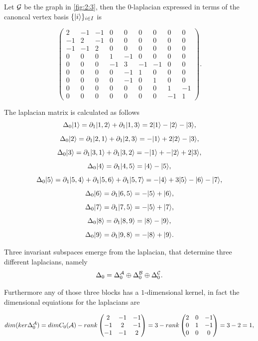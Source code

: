 \documentclass[../2.tex]{subfiles}
\begin{document}
    \begin{exa}
        Let $\mathcal{G}$ be the graph  in \autoref{fig:2:3}, then the $0$-laplacian expressed in terms of the canoncal vertex basis $\{| i \rangle\}_{i \in I}$ is

        \[\begin{pmatrix}
                2 & -1 & -1 & 0 & 0 & 0 & 0 & 0 & 0 \\
                -1 & 2 & -1 & 0 & 0 & 0 & 0 & 0 & 0 \\
                -1 & -1 & 2 & 0 & 0 & 0 & 0 & 0 & 0 \\
                0 & 0 & 0 & 1 & -1 & 0 & 0 & 0 & 0 \\
                0 & 0 & 0 & -1 & 3 & -1 & -1 & 0 & 0 \\
                0 & 0 & 0 & 0 & -1 & 1 & 0 & 0 & 0 \\
                0 & 0 & 0 & 0 & -1 & 0 & 1 & 0 & 0 \\
                0 & 0 & 0 & 0 & 0 & 0 & 0 & 1 & -1 \\
                0 & 0 & 0 & 0 & 0 & 0 & 0 & -1 & 1 
            \end{pmatrix}. \] 

        The laplacian matrix is calculated as follows
        \[ \Delta_0 | 1 \rangle = \partial_1| 1,2 \rangle + \partial_1| 1,3 \rangle = 2| 1 \rangle-| 2 \rangle-| 3 \rangle,\]
        \[ \Delta_0 | 2 \rangle = \partial_1| 2,1 \rangle + \partial_1| 2,3 \rangle = -| 1 \rangle+2| 2 \rangle-| 3 \rangle,\]
        \[ \Delta_0 | 3 \rangle = \partial_1| 3,1 \rangle + \partial_1| 3,2 \rangle = -| 1 \rangle+-| 2 \rangle+2| 3 \rangle,\]
        \[ \Delta_0 | 4 \rangle = \partial_1| 4,5 \rangle = | 4 \rangle-| 5 \rangle,\]
        \[ \Delta_0 | 5 \rangle = \partial_1| 5,4 \rangle+\partial_1| 5,6 \rangle+\partial_1| 5,7 \rangle = -| 4 \rangle+3| 5 \rangle-| 6 \rangle-| 7 \rangle,\]
        \[ \Delta_0 | 6 \rangle = \partial_1| 6,5 \rangle = -| 5 \rangle+| 6 \rangle,\]
        \[ \Delta_0 | 7 \rangle = \partial_1| 7,5 \rangle = -| 5 \rangle+| 7 \rangle,\]
        \[ \Delta_0 | 8 \rangle = \partial_1| 8,9 \rangle = | 8 \rangle-| 9 \rangle,\]
        \[ \Delta_0 | 9 \rangle = \partial_1| 9,8 \rangle = -| 8 \rangle+| 9 \rangle.\] 

        Three invariant subspaces emerge from the laplacian, that determine three different laplacians, namely
        \[ \Delta_0 = \Delta_0^{\mathcal{A}} \oplus \Delta_0^{\mathcal{B}} \oplus \Delta_0^{\mathcal{C}}. \]

        Furthermore any of those three blocks has a $1$-dimensional kernel, in fact the dimensional equiations for the laplacians are

        \[dim(ker\Delta_0^{\mathcal{A}}) =dimC_0(\mathcal{A}) - rank
        \begin{pmatrix}
            2 & -1 & -1  \\
            -1 & 2 & -1  \\
            -1 & -1 & 2 
        \end{pmatrix} = 3 - rank
        \begin{pmatrix}
            2 & 0 & -1  \\
            0 & 1 & -1  \\
            0 & 0 & 0 
        \end{pmatrix} = 3 - 2 =  1, \]


\end{exa}
\end{document}
